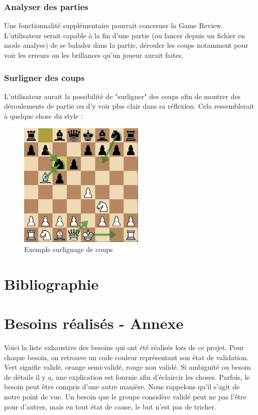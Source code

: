 \documentclass{article}
\begin{document}
\subsubsection{Analyser des parties}
Une fonctionnalité supplémentaire pourrait concerner la Game Review. L'utilisateur serait capable à la fin d'une partie (ou lancer depuis un fichier en mode 
analyse) de se balader dans la partie, dérouler les coups notamment pour voir les erreurs ou les brillances qu'un joueur aurait faites.

\subsubsection{Surligner des coups}
L'utilisateur aurait la possibilité de "surligner" des coups afin de montrer des déroulements de partie ou d'y voir plus clair dans sa réflexion.
Cela ressemblerait à quelque chose du style :\\
\begin{figure}[h]
    \caption{Exemple surlignage de coups}
    \centering
    \includegraphics[width=\textwidth,height=6.0cm,keepaspectratio]{surlignage-coups}
\end{figure}


\section{Bibliographie}
 
 


\section{Besoins réalisés - Annexe}
\label{Spec}

Voici la liste exhaustive des besoins qui ont été réalisés lors de ce projet. Pour chaque besoin, on retrouve un code couleur représentant
son état de validation. Vert signifie validé, orange semi-validé, rouge non validé. Si ambiguïté ou besoin de détails il y a, une explication
est fournie afin d'éclaircir les choses. Parfois, le besoin peut être compris d'une autre manière. Nous rappelons qu'il s'agit de notre point de vue.
Un besoin que le groupe considère validé peut ne pas l'être pour d'autres, mais en tout état de cause, le but n'est pas de tricher.
\end{document}
